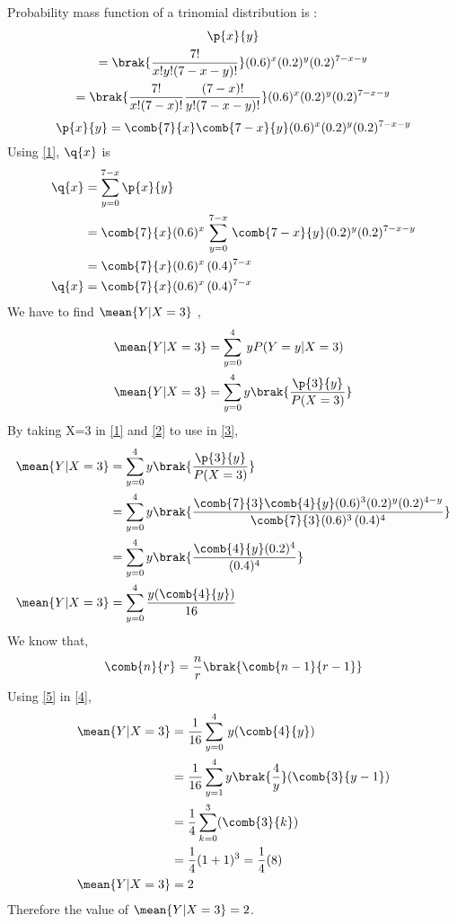 
Probability mass function of a trinomial  distribution is :
\begin{multline}
   \p{x}{y} \\=\brak{\frac{7!}{x!y!(7-x-y)!}}(0.6)^x(0.2)^y(0.2)^{7-x-y}\\
  \nonumber  =\brak{\frac{7!}{x!(7-x)!}\frac{(7-x)!}{y!(7-x-y)!}}(0.6)^x(0.2)^y(0.2)^{7-x-y}
\end{multline}
\begin{equation}
    \p{x}{y}=\comb{7}{x}\comb{7-x}{y}(0.6)^x(0.2)^y(0.2)^{7-x-y}\label{1}
\end{equation}
Using \eqref{1}, $\q{x}$ is 
\begin{align}
   \nonumber \q{x}&=\sum_{y=0}^{7-x} \p{x}{y}\\
  \nonumber &=\comb{7}{x}(0.6)^x\,\sum_{y=0}^{7-x}\, \comb{7-x}{y} (0.2)^y(0.2)^{7-x-y} \\
  \nonumber  &=\comb{7}{x}(0.6)^x\,{(0.4)^{7-x}}\\
    \q{x}&=\comb{7}{x}(0.6)^x\,{(0.4)^{7-x}}\label{2}
\end{align}
We have to find $\mean{Y|X=3}$ ,
\begin{align}
    \mean{Y|X=3}&=\sum_{y=0}^4 \: y P(Y=y|X=3)\\
    \mean{Y|X=3}&=\sum_{y=0}^4 y \brak{  \frac{ \p{3}{y}}{P(X=3)} }\label{3}
\end{align}
By taking X=3 in \eqref{1} and \eqref{2}  to use in \eqref{3},
\begin{align}
   \nonumber \mean{Y|X=3}&=\sum_{y=0}^4 y \brak{ \frac{ \p{3}{y}}{P(X=3)}}\\
  \nonumber  &=\sum_{y=0}^4 y   \brak{\frac{\comb{7}{3}\comb{4}{y}(0.6)^3(0.2)^y(0.2)^{4-y}}{\comb{7}{3}(0.6)^3\,{(0.4)^{4}}}}\\
 \nonumber &=\sum_{y=0}^4 y   \brak{\frac{\comb{4}{y}(0.2)^{4}}{{(0.4)^{4}}}}\\
 \mean{Y|X=3}&=\sum_{y=0}^4 {\frac{y(\comb{4}{y})}{{16}}}\label{4}
 \end{align}
 We know that,
 \begin{align}
     \comb{n}{r} = \frac{n}{r}\brak{\comb{n-1}{r-1}}\label{5}
 \end{align}
 Using \eqref{5} in \eqref{4},
 \begin{align}
  \mean{Y|X=3}&=\frac{1}{16}\sum_{y=0}^4\, {y(\comb{4}{y})}\\
  &=\frac{1}{16}\sum_{y=1}^{4} y\brak{\frac{4}{y}}(\comb{3}{y-1})\\
  &=\frac{1}{4}\sum_{k=0}^{3}(\comb{3}{k})\\
  &=\frac{1}{4}(1+1)^3=\frac{1}{4}(8)\\
  \mean{Y|X=3}&=2
\end{align}
Therefore the value of $\mean{Y|X=3}=2$.